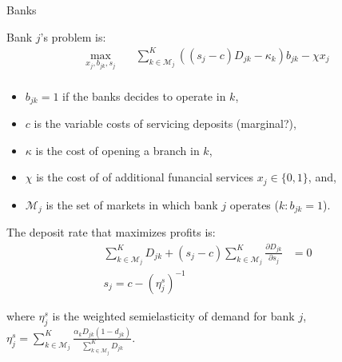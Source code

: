 \documentclass[notes,10pt, aspectratio=169]{beamer}
\newenvironment{wideitemize}{\itemize\addtolength{\itemsep}{10pt}}{\enditemize}
\begin{document}
            \begin{frame}{Banks}
            
                \begin{wideitemize}
                \item Bank $j$'s problem is: 
                \begin{equation}
                \begin{aligned}
                    \max _{x_j, b_{jk},s_j} & \quad \sum_{k\in\mathcal{M}_j}^K ((s_j-c)D_{jk} - \kappa_k)b_{jk} - \chi x_j  \\
                    \end{aligned}
                \end{equation}

                \begin{itemize}
                    \item $b_{jk}=1$ if the banks decides to operate in $k$,
                    \item $c$ is the variable costs of servicing deposits (marginal?),
                    \item $\kappa$ is the cost of opening a branch in $k$,
                    \item $\chi$ is the cost of of additional funancial services $x_j \in \{0,1\}$, and,
                    \item $\mathcal{M}_j$ is the set of markets in which bank $j$ operates ($k: b_{jk}=1$).
                \end{itemize}
                \item The deposit rate that maximizes profits is:
                    \begin{equation}
                        \begin{align}
                    \sum_{k\in\mathcal{M}_j}^K D_{jk} + (s_j-c)   \sum_{k\in\mathcal{M}_j}^K \frac{\partial D_{jk}}{\partial s_j} &= 0 \\
                    s_j = c -(\eta_j^s)^{-1} 
                    \end{align}
                    \end{equation}

                \item where $\eta_j^s$ is the weighted semielasticity of demand for bank $j$, $\eta_j^s = \sum_{k\in\mathcal{M}_j}^K \frac{\alpha_k D_{jk} (1-d_{jk})}{\sum_{k\in\mathcal{M}_j}^K D_{jk}}$.
                    \end{wideitemize}
                
            \end{frame}
            
\end{document}
